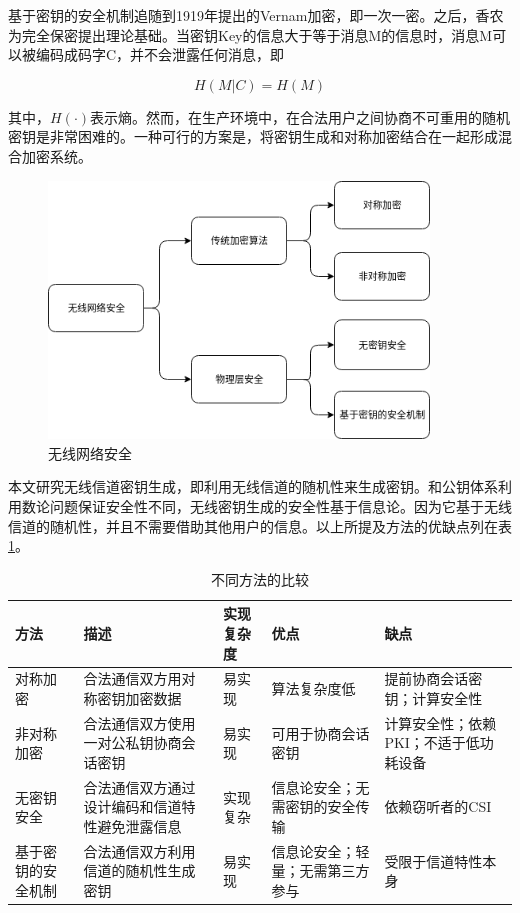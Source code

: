 \documentclass[master]{seuthesis} %
\begin{document}
\begin{Main}
基于密钥的安全机制追随到1919年提出的Vernam加密，即一次一密\cite{vernam1922secret}。之后，香农为完全保密提出理论基础\cite{shannon1949communication}。当密钥Key的信息大于等于消息M的信息时，消息M可以被编码成码字C，并不会泄露任何消息，即

\begin{equation}
    H(M|C) = H(M)
\end{equation}

其中，$H(\cdot)$表示熵。然而，在生产环境中，在合法用户之间协商不可重用的随机密钥是非常困难的。一种可行的方案是，将密钥生成和对称加密结合在一起形成混合加密系统。

\begin{figure}[htbp!]
    \centering \includegraphics[width=0.9\textwidth]{images/wireless-network-security} 
    \caption{无线网络安全}
    \label{wirelss-network-security}
\end{figure}

本文研究无线信道密钥生成，即利用无线信道的随机性来生成密钥。和公钥体系利用数论问题保证安全性不同，无线密钥生成的安全性基于信息论。因为它基于无线信道的随机性\cite{ahlswede1993common}\cite{maurer1993secret}，并且不需要借助其他用户的信息。以上所提及方法的优缺点列在表\ref{comparison-different-schemes}。

\begin{table}[]
    \centering
    \begin{tabular}{|l|l|l|l|l|}
    \hline
    方法 & 描述 & 实现复杂度 & 优点 & 缺点 \\ \hline
    对称加密 & 合法通信双方用对称密钥加密数据 & 易实现 & 算法复杂度低 & 提前协商会话密钥；计算安全性 \\ \hline
    非对称加密 & 合法通信双方使用一对公私钥协商会话密钥 & 易实现 & 可用于协商会话密钥 & 计算安全性；依赖PKI；不适于低功耗设备 \\ \hline
    无密钥安全 & 合法通信双方通过设计编码和信道特性避免泄露信息 & 实现复杂 & 信息论安全；无需密钥的安全传输 & 依赖窃听者的CSI \\ \hline
    基于密钥的安全机制 & 合法通信双方利用信道的随机性生成密钥 & 易实现 & 信息论安全；轻量；无需第三方参与 & 受限于信道特性本身 \\ \hline
    \end{tabular}
    \caption{不同方法的比较
    \label{comparison-different-schemes}}
\end{table}


\end{Main}
\end{document}
